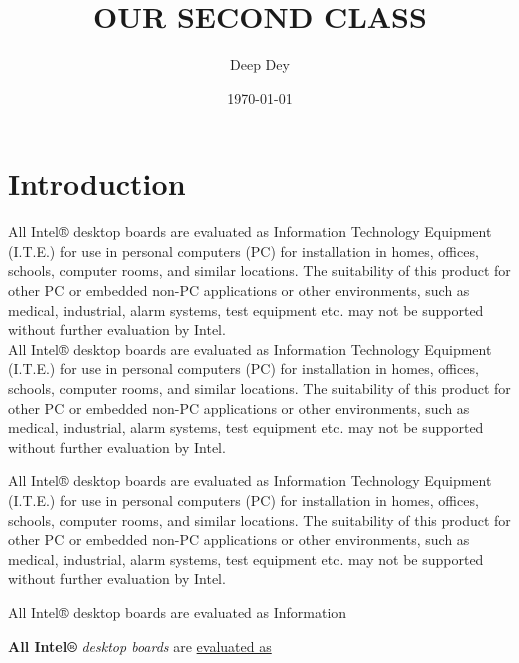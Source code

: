 \documentclass[12pt]{article}
\title{OUR SECOND CLASS}
\author{Deep Dey}
\date{\today}
\begin{document}
    
    \maketitle
    \hrulefill
    \vspace{1cm}
    \tableofcontents
    \pagebreak
    
    \section{Introduction}
     All Intel® desktop boards are evaluated as Information Technology Equipment (I.T.E.) for use in personal computers (PC) for installation in homes, offices, schools, computer rooms, and similar locations. The suitability of this product for other PC or embedded non-PC applications or other environments, such as medical, industrial, alarm systems, test equipment etc. may not be supported without further evaluation by Intel.\\
    
     \noindent All Intel® desktop boards are evaluated as Information Technology Equipment (I.T.E.) for use in personal computers (PC) for installation in homes, offices, schools, computer rooms, and similar locations. The suitability of this product for other PC or embedded non-PC applications or other environments, such as medical, industrial, alarm systems, test equipment etc. may not be supported without further evaluation by Intel.\\

\begin{center}
All Intel® desktop boards are evaluated as Information Technology Equipment (I.T.E.) for use in personal computers (PC) for installation in homes, offices, schools, computer rooms, and similar locations. The suitability of this product for other PC or embedded non-PC applications or other environments, such as medical, industrial, alarm systems, test equipment etc. may not be supported without further evaluation by Intel.
\end{center}

\begin{flushright}
All Intel® desktop boards are evaluated as Information
\end{flushright}

\textbf{All Intel®} \textit{desktop boards} are \underline{evaluated as}
\end{document}
